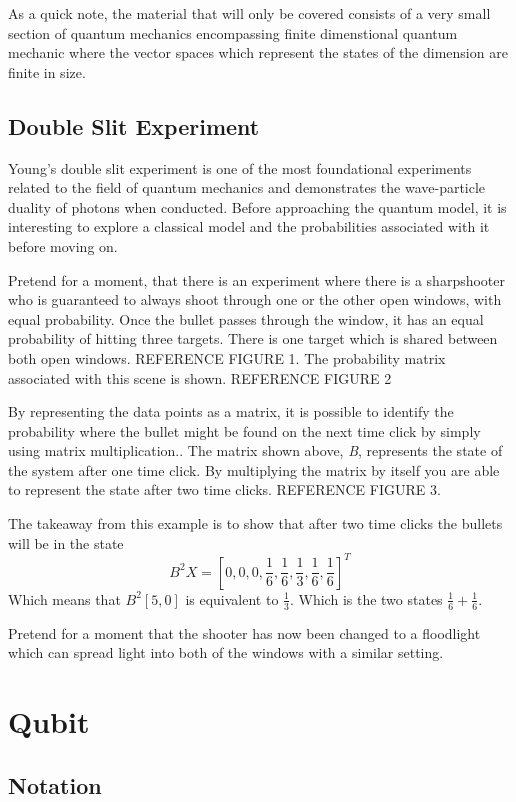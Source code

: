 \documentclass[12pt]{article}
\begin{document}
As a quick note, the material that will only be covered consists of a very small section of quantum mechanics encompassing finite dimenstional quantum mechanic where the vector spaces which represent the states of the dimension are finite in size.\par

\subsection{Double Slit Experiment}
Young's double slit experiment is one of the most foundational experiments related to the field of quantum mechanics and demonstrates the wave-particle duality of photons when conducted. Before approaching the quantum model, it is interesting to explore a classical model and the probabilities associated with it before moving on.\par
Pretend for a moment, that there is an experiment where there is a sharpshooter who is guaranteed to always shoot through one or the other open windows, with equal probability. Once the bullet passes through the window, it has an equal probability of hitting three targets. There is one target which is shared between both open windows. REFERENCE FIGURE 1. The probability matrix associated with this scene is shown. REFERENCE FIGURE 2 \par
By representing the data points as a matrix, it is possible to identify the probability where the bullet might be found on the next time click by simply using matrix multiplication.\cite{intro}. The matrix shown above, \textit{B}, represents the state of the system after one time click. By multiplying the matrix by itself you are able to represent the state after two time clicks. REFERENCE FIGURE 3.\par
The takeaway from this example is to show that after two time clicks the bullets will be in the state \[B^2X = [0,0,0,\frac{1}{6},\frac{1}{6},\frac{1}{3},\frac{1}{6},\frac{1}{6}]^T\]
Which means that \(B^2[5,0]\) is equivalent to \(\frac{1}{3}\). Which is the two states \(\frac{1}{6}+\frac{1}{6}\).\par

Pretend for a moment that the shooter has now been changed to a floodlight which can spread light into both of the windows with a similar setting.

\section{Qubit}
\subsection{Notation}
\end{document}
